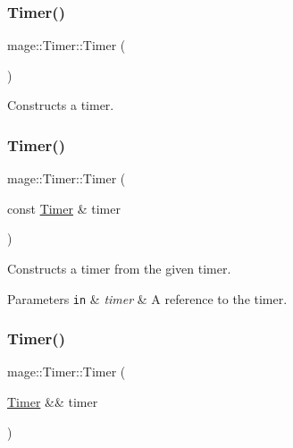 \subsubsection{\texorpdfstring{Timer()}{Timer()}\hspace{0.1cm}{\footnotesize\ttfamily [1/3]}}
{\footnotesize\ttfamily mage\+::\+Timer\+::\+Timer (\begin{DoxyParamCaption}{ }\end{DoxyParamCaption})}

Constructs a timer. \hypertarget{classmage_1_1_timer_a5a1e05fde40a44cd9434572712142c23}{}\label{classmage_1_1_timer_a5a1e05fde40a44cd9434572712142c23} 
\subsubsection{\texorpdfstring{Timer()}{Timer()}\hspace{0.1cm}{\footnotesize\ttfamily [2/3]}}
{\footnotesize\ttfamily mage\+::\+Timer\+::\+Timer (\begin{DoxyParamCaption}\item[{const \hyperlink{classmage_1_1_timer}{Timer} \&}]{timer }\end{DoxyParamCaption})\hspace{0.3cm}{\ttfamily [default]}}

Constructs a timer from the given timer.


\begin{DoxyParams}[1]{Parameters}
\mbox{\tt in}  & {\em timer} & A reference to the timer. \\
\hline
\end{DoxyParams}
\hypertarget{classmage_1_1_timer_a5fb4b89725b16e0d4b1fbae2f95f30cb}{}\label{classmage_1_1_timer_a5fb4b89725b16e0d4b1fbae2f95f30cb} 
\subsubsection{\texorpdfstring{Timer()}{Timer()}\hspace{0.1cm}{\footnotesize\ttfamily [3/3]}}
{\footnotesize\ttfamily mage\+::\+Timer\+::\+Timer (\begin{DoxyParamCaption}\item[{\hyperlink{classmage_1_1_timer}{Timer} \&\&}]{timer }\end{DoxyParamCaption})\hspace{0.3cm}{\ttfamily [default]}}


